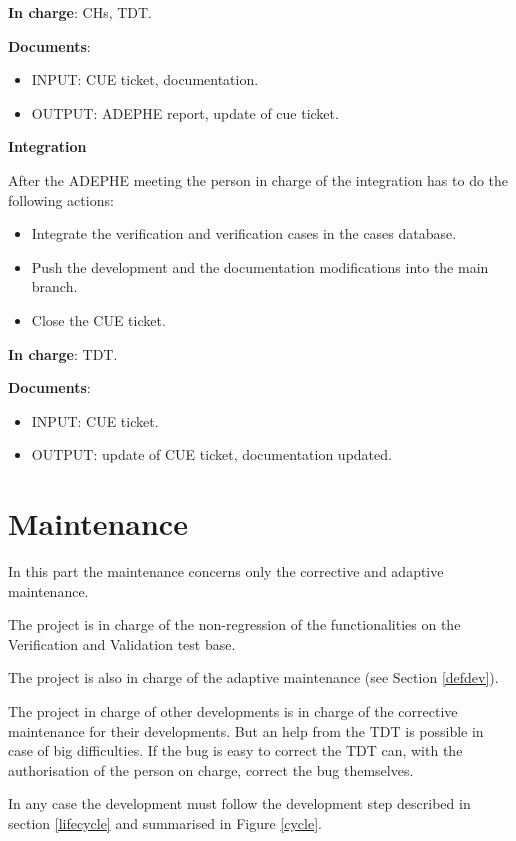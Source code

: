 \textbf{In charge}: CHs, TDT.

\textbf{Documents}:
\begin{itemize}
\item INPUT: CUE ticket, documentation.
\item OUTPUT: ADEPHE report, update of cue ticket.
\end{itemize}

\textbf{Integration}

After the ADEPHE meeting the person in charge of the integration has to do the
following actions:
\begin{itemize}
\item Integrate the verification and verification cases in the cases database. 
\item Push the development and the documentation modifications into the \telemacsystem
main branch.
\item Close the CUE ticket.
\end{itemize}

\textbf{In charge}: TDT.

\textbf{Documents}:
\begin{itemize}
\item INPUT: CUE ticket.
\item OUTPUT: update of CUE ticket, documentation updated.
\end{itemize}

\section{Maintenance}

In this part the maintenance concerns only the corrective and adaptive maintenance.

The \telemacsystem project is in charge of the non-regression of the \telemacsystem
functionalities on the Verification and Validation test base. 

The \telemacsystem project is also in charge of the adaptive maintenance (see Section
\ref{defdev}).

The project in charge of other developments is in charge of the corrective
maintenance for their developments. But an help from the TDT is possible in
case of big difficulties. If the bug is easy to correct the TDT can, with the
authorisation of the person on charge, correct the bug themselves.

In any case the development must follow the development step described in
section \ref{lifecycle} and summarised in Figure \ref{cycle}.

